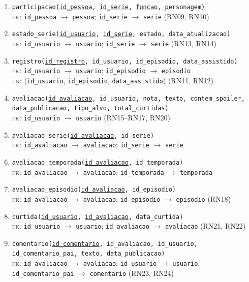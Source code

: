 \documentclass[a4paper,12pt,oneside,openany]{book}
\newcommand{\id}[1]{\texttt{#1}}
\begin{document}
\begin{enumerate}[leftmargin=2em]
    \item \id{participacao(\underline{id\_pessoa}, \underline{id\_serie}, \underline{funcao}, personagem)}\\
    \textsc{fk}: \id{id\_pessoa} $\rightarrow$ \id{pessoa}; \id{id\_serie}
$\rightarrow$ \id{serie} \hfill (RN09, RN10)

    \item \id{estado\_serie(\underline{id\_usuario}, \underline{id\_serie}, estado, data\_atualizacao)}\\
    \textsc{fk}: \id{id\_usuario} $\rightarrow$ \id{usuario}; \id{id\_serie}
$\rightarrow$ \id{serie} \hfill (RN13, RN14)

    \item \id{registro(\underline{id\_registro}, id\_usuario, id\_episodio, data\_assistido)}\\
    \textsc{fk}: \id{id\_usuario} $\rightarrow$ \id{usuario}; \id{id\_episodio} $\rightarrow$ \id{episodio}\\
    \textsc{uk}: (\id{id\_usuario}, \id{id\_episodio}, \id{data\_assistido}) \hfill
(RN11, RN12)

    \item \id{avaliacao(\underline{id\_avaliacao}, id\_usuario, nota, texto, contem\_spoiler, data\_publicacao, tipo\_alvo, total\_curtidas)}\\
    \textsc{fk}: \id{id\_usuario} $\rightarrow$ \id{usuario} \hfill (RN15--RN17, RN20)

    \item \id{avaliacao\_serie(\underline{id\_avaliacao}, id\_serie)}\\
    \textsc{fk}: \id{id\_avaliacao} $\rightarrow$ \id{avaliacao}; \id{id\_serie}
$\rightarrow$ \id{serie}

    \item \id{avaliacao\_temporada(\underline{id\_avaliacao}, id\_temporada)}\\
    \textsc{fk}: \id{id\_avaliacao} $\rightarrow$ \id{avaliacao}; \id{id\_temporada}
$\rightarrow$ \id{temporada}

    \item \id{avaliacao\_episodio(\underline{id\_avaliacao}, id\_episodio)}\\
    \textsc{fk}: \id{id\_avaliacao} $\rightarrow$ \id{avaliacao}; \id{id\_episodio}
$\rightarrow$ \id{episodio} \hfill (RN18)

    \item \id{curtida(\underline{id\_usuario}, \underline{id\_avaliacao}, data\_curtida)}\\
    \textsc{fk}: \id{id\_usuario} $\rightarrow$ \id{usuario}; \id{id\_avaliacao}
$\rightarrow$ \id{avaliacao} \hfill (RN21, RN22)

    \item \id{comentario(\underline{id\_comentario}, id\_avaliacao, id\_usuario, id\_comentario\_pai, texto, data\_publicacao)}\\
    \textsc{fk}: \id{id\_avaliacao} $\rightarrow$ \id{avaliacao}; \id{id\_usuario}
$\rightarrow$ \id{usuario};
    \id{id\_comentario\_pai} $\rightarrow$ \id{comentario} \hfill (RN23, RN24)
\end{enumerate}
\end{document}
